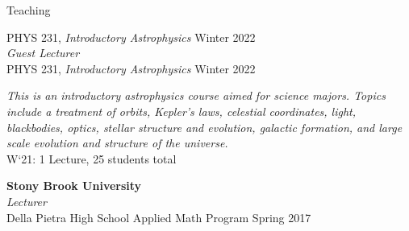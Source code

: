 \documentclass{resume} %
\newcommand{\forceindent}{\leavevmode{\parindent=1em\indent}}
\begin{document}
\begin{rSection}{Teaching}
\begin{description}[leftmargin=2em, style=nextline]
\end{description}
\vspace{-0.5}
\forceindent PHYS 231, \textit{Introductory Astrophysics} \hfill {Winter 2022}\\
\textit{Guest Lecturer} \\
\forceindent PHYS 231, \textit{Introductory Astrophysics} \hfill {Winter 2022}
\begin{description}[leftmargin=2em, style=nextline]
\vspace{-0.5em}
\item[~]\textit{This is an introductory astrophysics course aimed for science majors. Topics include
a treatment of orbits, Kepler’s laws, celestial coordinates, light, blackbodies, optics, stellar structure and
evolution, galactic formation, and large scale evolution and structure of the universe.}\\
\forceindent \forceindent W`21: 1 Lecture, 25 students total
\end{description}
\vspace{-0.5}
\textbf{Stony Brook University} \\
\textit{Lecturer}\\
\forceindent  Della Pietra High School Applied Math Program \hfill {Spring 2017}


\end{rSection}
\end{document}
